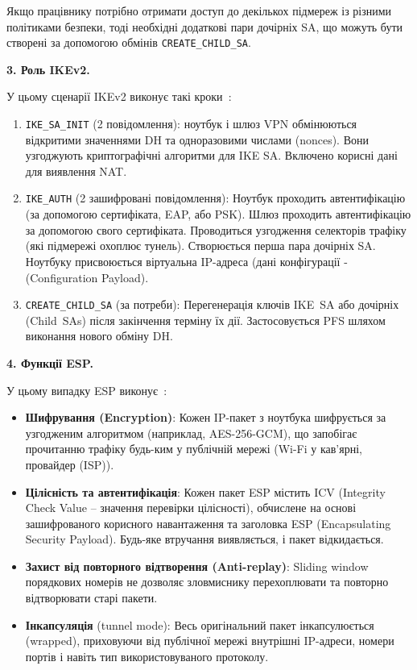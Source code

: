 Якщо працівнику потрібно отримати доступ до декількох підмереж із різними політиками безпеки, тоді необхідні додаткові 
пари дочірніх SA, що можуть бути створені за допомогою обмінів \texttt{CREATE\_CHILD\_SA}.

\textbf{3. Роль IKEv2.}

У цьому сценарії IKEv2 виконує такі кроки~\cite{rfc7296}:

\begin{enumerate}
    \item \texttt{IKE\_SA\_INIT} (2 повідомлення): ноутбук і шлюз VPN обмінюються відкритими значеннями DH та
        одноразовими числами (nonces). Вони узгоджують криптографічні алгоритми для IKE SA. Включено корисні 
        дані для виявлення NAT.
    \item \texttt{IKE\_AUTH} (2 зашифровані повідомлення): Ноутбук проходить автентифікацію (за допомогою 
        сертифіката, EAP, або PSK). Шлюз проходить автентифікацію за допомогою свого сертифіката. Проводиться 
        узгодження селекторів трафіку (які підмережі охоплює тунель). Створюється перша пара дочірніх SA. Ноутбуку 
        присвоюється віртуальна IP-адреса (дані конфігурації - (Configuration Payload).
    \item \texttt{CREATE\_CHILD\_SA} (за потреби): Перегенерація ключів IKE~SA або дочірніх (Child~SAs) після 
    закінчення терміну їх дії. Застосовується PFS шляхом виконання нового обміну DH.
\end{enumerate}

\textbf{4. Функції ESP.}

У цьому випадку ESP виконує~\cite{rfc4303}:
\begin{itemize}
    \item \textbf{Шифрування (Encryption)}: Кожен IP-пакет з ноутбука шифрується за узгодженим алгоритмом 
        (наприклад, AES-256-GCM), що запобігає прочитанню трафіку будь-ким у публічній мережі (Wi-Fi у кав’ярні, 
        провайдер (ISP)).
    \item \textbf{Цілісність та автентифікація}: Кожен пакет ESP містить ICV (Integrity Check Value -- значення 
        перевірки цілісності), обчислене на основі зашифрованого корисного навантаження та заголовка ESP 
        (Encapsulating Security Payload). Будь-яке втручання виявляється, і пакет відкидається.
    \item \textbf{Захист від повторного відтворення (Anti-replay)}: Sliding window порядкових номерів не дозволяє 
        зловмиснику перехоплювати та повторно відтворювати старі пакети.
    \item \textbf{Інкапсуляція} (tunnel mode): Весь оригінальний пакет інкапсулюється (wrapped), приховуючи від 
        публічної мережі внутрішні IP-адреси, номери портів і навіть тип використовуваного протоколу.
\end{itemize}

